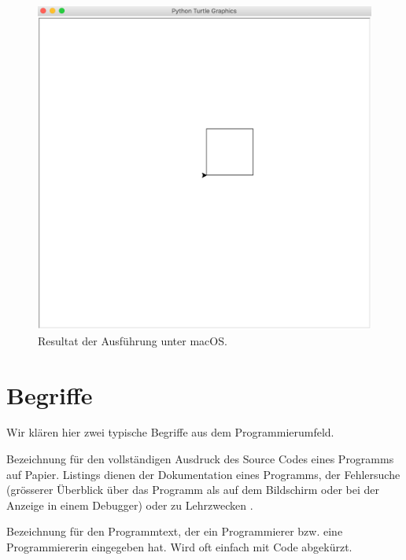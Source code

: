 \begin{example}
\begin{figure}[htb]
\centering
\includegraphics[scale=0.3]{quadrat.png}
\caption{Resultat der Ausführung unter macOS.}
\label{figure-quadrat}
\end{figure}

\end{example}

\section{Begriffe}

Wir klären hier zwei typische Begriffe aus dem Programmierumfeld.

\begin{definition}
Bezeichnung für den vollständigen Ausdruck des Source Codes eines Programms auf Papier. Listings dienen der Dokumentation eines Programms, der Fehlersuche (grösserer Überblick über das Programm als auf dem Bildschirm oder bei der Anzeige in einem Debugger) oder zu Lehrzwecken \cite{def-listing}.
\end{definition}

\begin{definition}
Bezeichnung für den Programmtext, der ein Programmierer bzw. eine Programmiererin eingegeben hat. Wird oft einfach mit Code abgekürzt.
\end{definition}

